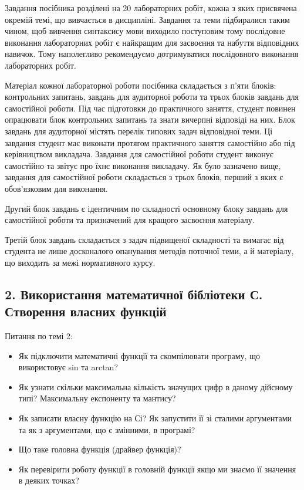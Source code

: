 \documentclass[]{article}
\begin{document}
Завдання посібника розділені на 20 лабораторних робіт, кожна з яких
присвячена окремій темі, що вивчається в дисципліні. Завдання та теми
підбиралися таким чином, щоб вивчення синтаксису мови виходило
поступовим тому послідовне виконання лабораторних робіт є найкращим для
засвоєння та набуття відповідних навичок. Тому наполегливо рекомендуємо
дотримуватися послідовного виконання лабораторних робіт.

Матеріал кожної лабораторної роботи посібника складається з п'яти
блоків: контрольних запитань, завдань для аудиторної роботи та трьох
блоків завдань для самостійної роботи. Під час підготовки до практичного
заняття, студент повинен опрацювати блок контрольних запитань та знати
вичерпні відповіді на них. Блок завдань для аудиторної містять перелік
типових задач відповідної теми. Ці завдання студент має виконати
протягом практичного заняття самостійно або під керівництвом викладача.
Завдання для самостійної роботи студент виконує самостійно та звітує про
їхнє виконання викладачу. Як було зазначено вище, завдання для
самостійної роботи складається з трьох блоків, перший з яких є
обов'язковим для виконання.

Другий блок завдань є ідентичним по складності основному блоку завдань
для самостійної роботи та призначений для кращого засвоєння матеріалу.

Третій блок завдань складається з задач підвищеної складності та вимагає
від студента не лише досконалого опанування методів поточної теми, а й
матеріалу, що виходить за межі нормативного курсу.


\newpage
\subsection{ 2. Використання математичної бібліотеки С. Створення власних функцій }
\setcounter{subsection}{1}

Питання по темі 2:

\begin{itemize}
\item
  Як підключити математичні функції та скомпілювати програму, що
  використовує sin та arctan?

\item
  Як узнати скільки максимальна кількість значущих цифр в даному
  дійсному типі? Максимальну експоненту та мантису?

\item
  Як записати власну функцію на Сі? Як запустити її зі сталими
  аргументами та як з аргументами, що є змінними, в програмі?

\item
  Що таке головна функція (драйвер функція)?

\item
  Як перевірити роботу функції в головній функції якщо ми знаємо 
її значення в деяких точках? 

\end{itemize}
\end{document}
